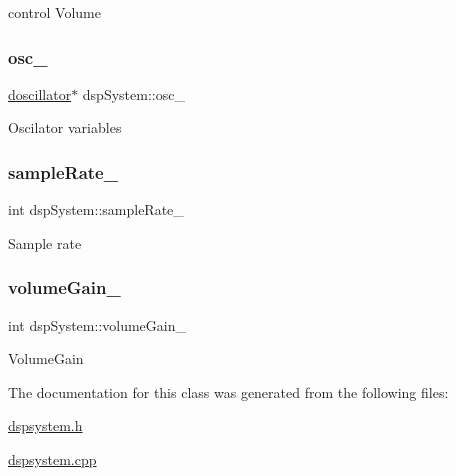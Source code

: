 control Volume \mbox{\label{classdspSystem_a47e78629937cbd18a4368f81503e1714}} 
\subsubsection{\texorpdfstring{osc\+\_\+}{osc\_}}
{\footnotesize\ttfamily \hyperlink{classdoscillator}{doscillator}$\ast$ dsp\+System\+::osc\+\_\+\hspace{0.3cm}{\ttfamily [protected]}}

Oscilator variables \mbox{\label{classdspSystem_a1021bd767ff7541a07638f8a5e0b9a3e}} 
\subsubsection{\texorpdfstring{sample\+Rate\+\_\+}{sampleRate\_}}
{\footnotesize\ttfamily int dsp\+System\+::sample\+Rate\+\_\+\hspace{0.3cm}{\ttfamily [protected]}}

Sample rate \mbox{\label{classdspSystem_a2385f59dd33cffc8f3ef91c159cf8290}} 
\subsubsection{\texorpdfstring{volume\+Gain\+\_\+}{volumeGain\_}}
{\footnotesize\ttfamily int dsp\+System\+::volume\+Gain\+\_\+\hspace{0.3cm}{\ttfamily [protected]}}

Volume\+Gain 

The documentation for this class was generated from the following files\+:\begin{DoxyCompactItemize}
\item 
\hyperlink{dspsystem_8h}{dspsystem.\+h}\item 
\hyperlink{dspsystem_8cpp}{dspsystem.\+cpp}\end{DoxyCompactItemize}
